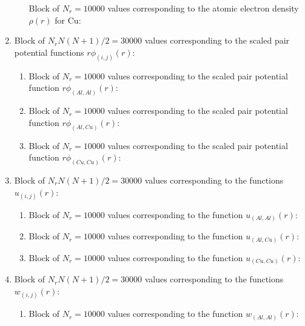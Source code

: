 \documentclass{article}
\begin{document}
\begin{enumerate}
\begin{enumerate}
			Block of $N_{r}=10000$ values corresponding to the atomic electron density $\rho(r)$ for Cu:
		\end{enumerate}
		
		\item  Block of $N_rN(N+1)/2=30000$ values corresponding to the scaled pair potential functions $r\phi_{(i,j)}(r)$:
		\begin{enumerate}
			\item Block of $N_r=10000$ values corresponding to the scaled pair potential function $r\phi_{(Al,Al)}(r)$:
			
			\item Block of $N_r=10000$ values corresponding to the scaled pair potential function $r\phi_{(Al,Cu)}(r)$:
			
			\item Block of $N_r=10000$ values corresponding to the scaled pair potential function $r\phi_{(Cu,Cu)}(r)$:
		\end{enumerate}
		
		\item  Block of $N_rN(N+1)/2=30000$ values corresponding to the functions $u_{(i,j)}(r)$:
		\begin{enumerate}
			\item Block of $N_r=10000$ values corresponding to the function $u_{(Al,Al)}(r)$:
			
			\item Block of $N_r=10000$ values corresponding to the function $u_{(Al,Cu)}(r)$:
			
			\item Block of $N_r=10000$ values corresponding to the function $u_{(Cu,Cu)}(r)$:
		\end{enumerate}
		
		
		\item  Block of $N_rN(N+1)/2=30000$ values corresponding to the functions $w_{(i,j)}(r)$:
		\begin{enumerate}
			\item Block of $N_r=10000$ values corresponding to the function $w_{(Al,Al)}(r)$:
			

\end{enumerate}
\end{enumerate}
\end{document}
